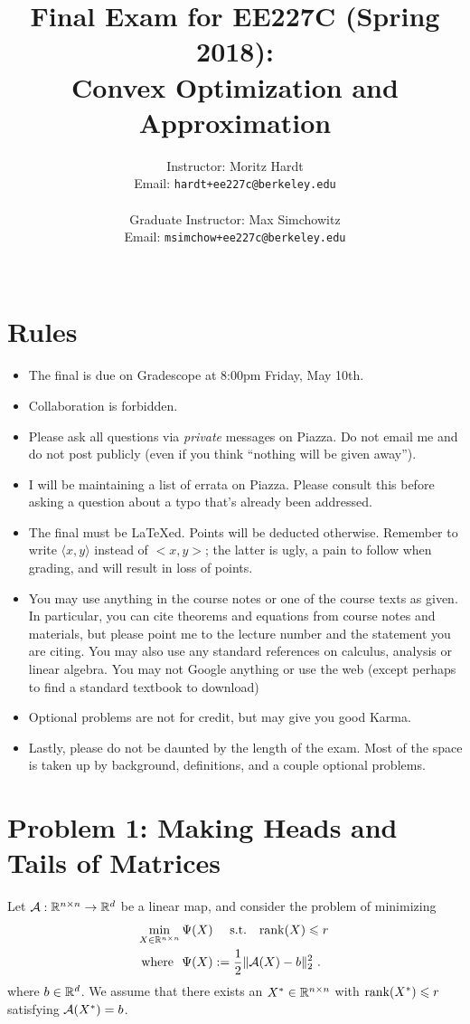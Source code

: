 \documentclass[12pt]{article}
\title{Final Exam for EE227C (Spring 2018):\\
 Convex Optimization and Approximation }
\author{Instructor: Moritz Hardt\\
{\small Email: \tt hardt+ee227c@berkeley.edu}\\ ~\\
Graduate Instructor: Max Simchowitz\\
{\small Email: \tt msimchow+ee227c@berkeley.edu}\\ ~\\
}
\begin{document}


\maketitle

\section*{Rules}
\begin{itemize}
	\item The final is due on Gradescope at 8:00pm Friday, May 10th.
	\item Collaboration is forbidden. 
	\item Please ask all questions via \emph{private} messages on Piazza. Do not email me and do not post publicly (even if you think ``nothing will be given away'').
	\item I will be maintaining a list of errata on Piazza. Please consult this before asking a question about a typo that's already been addressed.
	\item The final must be LaTeXed. Points will be deducted otherwise. Remember to write $\langle x, y \rangle$ instead of $<x,y>$; the latter is ugly, a pain to follow when grading, and will result in loss of points.
	\item You may use anything in the course notes or one of the course texts as given. In particular, you can cite theorems and equations from course notes and materials, but please point me to the lecture number and the statement you are citing. You may also use any standard references on calculus, analysis or linear algebra. You may not Google anything or use the web (except perhaps to find a standard textbook to download)
	\item Optional problems are not for credit, but may give you good Karma.
	\item Lastly, please do not be daunted by the length of the exam. Most of the space is taken up by background, definitions, and a couple optional problems. 
\end{itemize}
\newpage
\section*{Problem 1: Making Heads and Tails of Matrices}
	Let ${\cal A}: \mathbb{R}^{n \times n} \to \mathbb{R}^d$ be a linear map, and consider the problem of minimizing
	\begin{eqnarray*}
	&\min_{X \in \mathbb{R}^{n \times n}}\Psi(X)\quad~\text{s.t.}\quad \mathrm{rank}(X) \leqslant r~\\
	&\text{ where }~\Psi(X) := \frac{1}{2}\|{\cal A}(X)- b\|_{2}^2~. 
	\end{eqnarray*}
	where $b \in \mathbb{R}^d$. We assume that there exists an $X^* \in \mathbb{R}^{n \times n}$ with $\mathrm{rank}(X^*) \leqslant r$ satisfying ${\cal A}(X^*) = b$.
\end{document}
